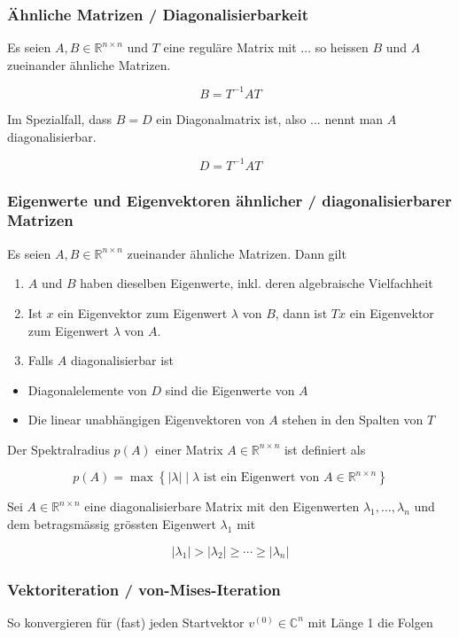 \subsubsection*{Ähnliche Matrizen / Diagonalisierbarkeit}
Es seien $A, B \in \mathbb{R}^{n \times n}$ und $T$ eine reguläre Matrix mit ... so heissen $B$ und $A$ zueinander ähnliche Matrizen.

$$
B=T^{-1} A T
$$

Im Spezialfall, dass $B=D$ ein Diagonalmatrix ist, also ... nennt man $A$ diagonalisierbar.

$$
D=T^{-1} A T
$$

\subsubsection*{Eigenwerte und Eigenvektoren ähnlicher / diagonalisierbarer Matrizen}
Es seien $A, B \in \mathbb{R}^{n \times n}$ zueinander ähnliche Matrizen. Dann gilt

\begin{enumerate}
  \item $A$ und $B$ haben dieselben Eigenwerte, inkl. deren algebraische Vielfachheit
  \item Ist $x$ ein Eigenvektor zum Eigenwert $\lambda$ von $B$, dann ist $T x$ ein Eigenvektor zum Eigenwert $\lambda$ von $A$.
  \item Falls $A$ diagonalisierbar ist
\end{enumerate}

\begin{itemize}
  \item Diagonalelemente von $D$ sind die Eigenwerte von $A$
  \item Die linear unabhängigen Eigenvektoren von $A$ stehen in den Spalten von $T$
\end{itemize}

Der Spektralradius $p(A)$ einer Matrix $A \in \mathbb{R}^{n \times n}$ ist definiert als

$$
p(A)=\max \left\{|\lambda| \mid \lambda \text { ist ein Eigenwert von } A \in \mathbb{R}^{n \times n}\right\}
$$

Sei $A \in \mathbb{R}^{n \times n}$ eine diagonalisierbare Matrix mit den Eigenwerten $\lambda_{1}, \ldots, \lambda_{n}$ und dem betragsmässig grössten Eigenwert $\lambda_{1}$ mit

$$
\left|\lambda_{1}\right|>\left|\lambda_{2}\right| \geq \cdots \geq\left|\lambda_{n}\right|
$$

\subsubsection*{Vektoriteration / von-Mises-Iteration}
So konvergieren für (fast) jeden Startvektor $v^{(0)} \in \mathbb{C}^{n}$ mit Länge 1 die Folgen

